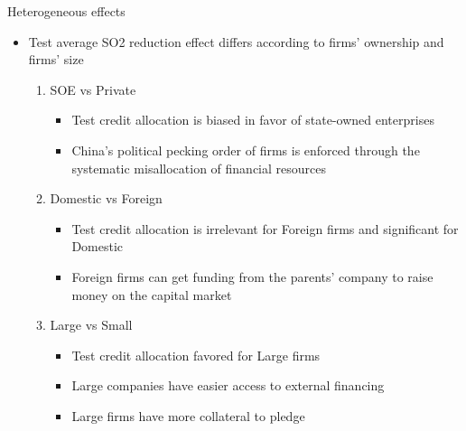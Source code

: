 \documentclass{beamer}
\begin{document}
\begin{frame}{Heterogeneous effects}
    \begin{itemize}
        \item Test average SO2 reduction effect differs according to firms’ ownership and firms’ size
        \begin{enumerate}
            \item SOE vs Private
            \begin{itemize}
                \item  Test credit allocation is biased in favor of state-owned enterprises
                \item  China's political pecking order of firms is enforced through the systematic misallocation of financial resources
            \end{itemize}
            \item Domestic vs Foreign
            \begin{itemize}
                \item  Test credit allocation is irrelevant for Foreign firms and significant for Domestic
                \item Foreign firms can get funding from the parents' company to raise money on the capital market
            \end{itemize}
            \item Large vs Small
            \begin{itemize}
                \item Test credit allocation favored for Large firms
                \item Large companies have easier access to external financing
                \item Large firms have more collateral to pledge
            \end{itemize}
        \end{enumerate}
    \end{itemize}
    
\end{frame}
\end{document}
